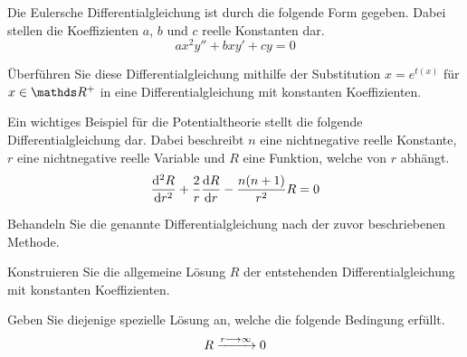\begin{atiTask}[
	title = Die homogene Euler-Gleichung
]
	Die Eulersche Differentialgleichung ist durch die folgende Form gegeben.
	Dabei stellen die Koeffizienten $a$, $b$ und $c$ reelle Konstanten dar.
	\[
		ax^2y'' + bxy' + cy = 0
	\]
	\begin{atiSubtasks}
		\item{
			Überführen Sie diese Differentialgleichung mithilfe der Substitution $x = e^{t(x)}$ für $x\in\setReal^+$ in eine Differentialgleichung mit konstanten Koeffizienten.
		}
		\item{
			Ein wichtiges Beispiel für die Potentialtheorie stellt die folgende Differentialgleichung dar.
			Dabei beschreibt $n$ eine nichtnegative reelle Konstante, $r$ eine nichtnegative reelle Variable und $R$ eine Funktion, welche von $r$ abhängt.
			\[
				\leibnizNDerivative[2]{R}{r} + \frac{2}{r}\leibnizNDerivative{R}{r} - \frac{n(n+1)}{r^2}R = 0
			\]
			\begin{atiSubsubtasks}
				\item{
					Behandeln Sie die genannte Differentialgleichung nach der zuvor beschriebenen Methode.
				}
				\item{
					Konstruieren Sie die allgemeine Lösung $R$ der entstehenden Differentialgleichung mit konstanten Koeffizienten.
				}
				\item{
					Geben Sie diejenige spezielle Lösung an, welche die folgende Bedingung erfüllt.
					\[
						R\converges[r\converges\infty]0
					\]
				}
			\end{atiSubsubtasks}
		}
	\end{atiSubtasks}
\end{atiTask}